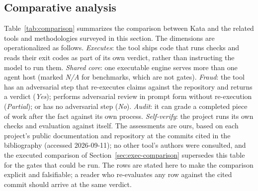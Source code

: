 \documentclass{sbc2019}%
\begin{document}
\subsection{Comparative analysis}

Table~\ref{tab:comparison} summarizes the comparison between Kata and the
related tools and methodologies surveyed in this section. The dimensions
are operationalized as follows. \emph{Executes}: the tool ships code that
runs checks and reads their exit codes as part of its own verdict, rather
than instructing the model to run them. \emph{Shared core}: one executable
engine serves more than one agent host (marked \emph{N/A} for benchmarks,
which are not gates). \emph{Fraud}: the tool has an adversarial step that
re-executes claims against the repository and returns a verdict
(\emph{Yes}); performs adversarial review in prompt form without
re-execution (\emph{Partial}); or has no adversarial step (\emph{No}).
\emph{Audit}: it can grade a completed piece of work after the fact
against its own process. \emph{Self-verify}: the project runs its own
checks and evaluation against itself. The assessments are ours,
based on each project's public documentation and repository at the
commits cited in the bibliography (accessed 2026-09-11); no other tool's
authors were consulted, and the executed comparison of
Section~\ref{sec:exec-comparison} supersedes this table for the gates that
could be run. The rows are stated here to make the comparison explicit and
falsifiable; a reader who re-evaluates any row against the cited commit
should arrive at the same verdict.
\end{document}
